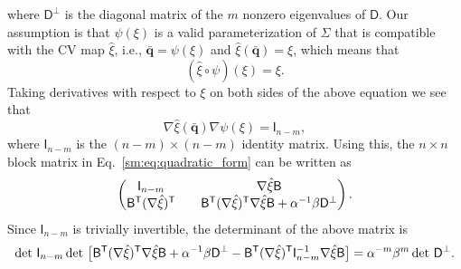 %
where $\mathsf{D}^\perp$ is the diagonal matrix of the $m$ nonzero eigenvalues of $\mathsf{D}$.
Our assumption is that $\psi(\xi)$ is a valid parameterization of $\Sigma$ that is compatible with the CV map $\hat{\xi}$, i.e., $\bar{\bm{q}} = \psi(\xi)$ and $\hat{\xi}(\bar{\bm{q}}) = \xi$, which means that
%
\begin{equation}
  (\hat{\xi}\circ\psi)(\xi) = \xi.
\end{equation}
%
Taking derivatives with respect to $\xi$ on both sides of the above equation we see that
%
\begin{equation}
  \nabla\hat{\xi}(\bar{\bm{q}})\nabla\psi(\xi) = \mathsf{I}_{n-m},
\end{equation}
%
where $\mathsf{I}_{n-m}$ is the $(n-m)\times(n-m)$ identity matrix.
Using this, the $n\times n$ block matrix in Eq.~\eqref{sm:eq:quadratic_form} can be written as
%
\begin{equation}
  \begin{pmatrix}
    \mathsf{I}_{n-m} &
    \quad\nabla\hat{\xi}\mathsf{B}\\
    \mathsf{B}^\mathsf{T}(\nabla\hat{\xi})^\mathsf{T} &
    \quad\mathsf{B}^\mathsf{T}(\nabla\hat{\xi})^\mathsf{T}\nabla\hat{\xi}\mathsf{B} + \alpha^{-1}\beta\mathsf{D}^\perp
  \end{pmatrix}.
\end{equation}
%
Since $\mathsf{I}_{n-m}$ is trivially invertible, the determinant of the above matrix is
%
\begin{equation}
  \det\,\mathsf{I}_{n-m}\det\,\big[\mathsf{B} \trans(\nabla\hat{\xi})\trans\nabla\hat{\xi}\mathsf{B}  + \alpha^{-1}\beta\mathsf{D}^\perp - \mathsf{B}\trans(\nabla\hat{\xi})\trans\mathsf{I}^{-1}_{n-m}\nabla\hat{\xi}\mathsf{B}\big]
  =
  \alpha^{-m}\beta^m \det\,\mathsf{D}^\perp.
  \label{sm:eq:determinant}
\end{equation}

